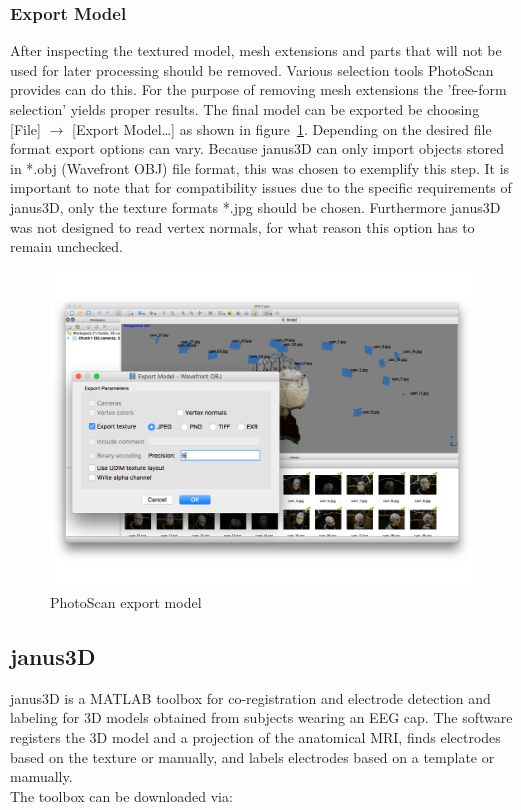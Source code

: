 \documentclass[12pt,a4paper]{scrartcl}
\begin{document}
\subsubsection{Export Model}
After inspecting the textured model, mesh extensions and parts that will not be used for later processing should be removed. Various selection tools PhotoScan provides can do this. For the purpose of removing mesh extensions the 'free-form selection' yields proper results. The final model can be exported be choosing [File] $\rightarrow$ [Export Model\dots] as shown in figure~\ref{fig:photoscanexport}. Depending on the desired file format export options can vary. Because janus3D can only import objects stored in *.obj (Wavefront OBJ) file format, this was chosen to exemplify this step. It is important to note that for compatibility issues due to the specific requirements of janus3D, only the texture formats *.jpg should be chosen. Furthermore janus3D was not designed to read vertex normals, for what reason this option has to remain unchecked.
\begin{figure}[!h]
  \includegraphics[width=1\textwidth]{PhotoScan-export}
  \caption{PhotoScan export model}
  \label{fig:photoscanexport}
\end{figure}

\FloatBarrier


\subsection{janus3D}
\label{sec:janus3D}
janus3D is a MATLAB toolbox for co-registration and electrode detection and labeling for 3D models obtained from subjects wearing an EEG cap. The software registers the 3D model and a projection of the anatomical MRI, finds electrodes based on the texture or manually, and labels electrodes based on a template or mamually.\\
The toolbox can be downloaded via:\\
\end{document}
